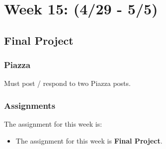 \clearpage

\renewcommand{\ChapTitle}{Week 15: (4/29 - 5/5)}
\renewcommand{\SectionTitle}{Final Project}

\chapter{\ChapTitle}

\section{\SectionTitle}

\subsection{Piazza}

Must post / respond to two Piazza posts. 

\subsection{Assignments}

The assignment for this week is:

\begin{itemize}
    \item The assignment for this week is \textbf{Final Project}. 
\end{itemize}